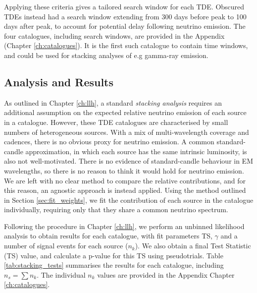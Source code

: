 Applying these criteria gives a tailored search window for each TDE. Obscured TDEs instead had a search window extending from 300 days before peak to 100 days after peak, to account for potential delay following neutrino emission. The four catalogues, including search windows, are provided in the Appendix (Chapter \ref{ch:catalogues}). It is the first such catalogue to contain time windows, and could be used for stacking analyses of e.g gamma-ray emission.

\subsection{Analysis and Results}

As outlined in Chapter \ref{ch:llh}, a standard \emph{stacking analysis} requires an additional assumption on the expected relative neutrino emission of each source in a catalogue. However, these TDE catalogues are characterised by small numbers of heterogeneous sources. With a mix of multi-wavelength coverage and cadences, there is no obvious proxy for neutrino emission. A common standard-candle approximation, in which each source has the same intrinsic luminosity, is also not well-motivated. There is no evidence of standard-candle behaviour in EM wavelengths, so there is no reason to think it would hold for neutrino emission. We are left with no clear method to compare the relative contributions, and for this reason, an agnostic approach is instead applied. Using the method outlined in Section \ref{sec:fit_weights}, we fit the contribution of each source in the catalogue individually, requiring only that they share a common neutrino spectrum.

Following the procedure in Chapter \ref{ch:llh}, we perform an unbinned likelihood analysis to obtain results for each catalogue, with fit parameters TS, $\gamma$ and a number of signal events for each source ($n_{k}$). We also obtain a final Test Statistic (TS) value, and calculate a p-value for this TS using pseudotrials. Table \ref{tab:stacking_tests} summarises the results for each catalogue, including $n_{s} = \sum n_{k}$. The individual $n_{k}$ values are provided in the Appendix Chapter \ref{ch:catalogues}.

